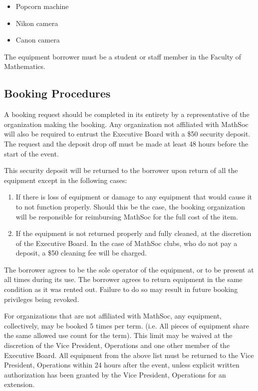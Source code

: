 \begin{itemize}
	\item Popcorn machine
	\item Nikon camera
	\item Canon camera
\end{itemize}

The equipment borrower must be a student or staff member in the Faculty of Mathematics.

\subsection{Booking Procedures}

A booking request should be completed in its entirety by a
representative of the organization making the booking. Any organization not
affiliated with MathSoc will also be required to entrust the Executive Board
with a \$50 security deposit. The request and the deposit drop off must be made
at least 48 hours before the start of the event.

This security deposit will be returned to the borrower upon return of all the
equipment except in the following cases:

\begin{enumerate}
	\item If there is loss of equipment or damage to any equipment that would cause it to not function
	      properly. Should this be the case, the booking organization will be
	      responsible for reimbursing MathSoc for the full cost of the item.
	\item If the equipment is not returned properly and fully cleaned, at the
	      discretion of the Executive Board. In the case of MathSoc clubs, who do not
	      pay a deposit, a \$50 cleaning fee will be charged.
\end{enumerate}

The borrower agrees to be the sole operator of the equipment, or to be present
at all times during its use. The borrower agrees to return equipment in the same condition as it was rented out. Failure to do so may result in future booking privileges being revoked.

For organizations that are not affiliated with MathSoc, any equipment,
collectively, may be booked 5 times per term. (i.e. All pieces of equipment
share the same allowed use count for the term). This limit may be waived at the
discretion of the Vice President, Operations and one other member of the
Executive Board. All equipment from the above list must be returned to the Vice President, 
Operations within 24 hours after the event, unless explicit written authorization has been 
granted by the Vice President, Operations for an extension. 


